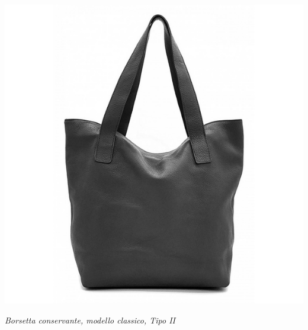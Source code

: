 \begin{center}
\includegraphics[width=0.6\linewidth]{immagini/borsetta.png}

\textit{Borsetta conservante, modello classico, Tipo II}
\end{center}


\medskip

